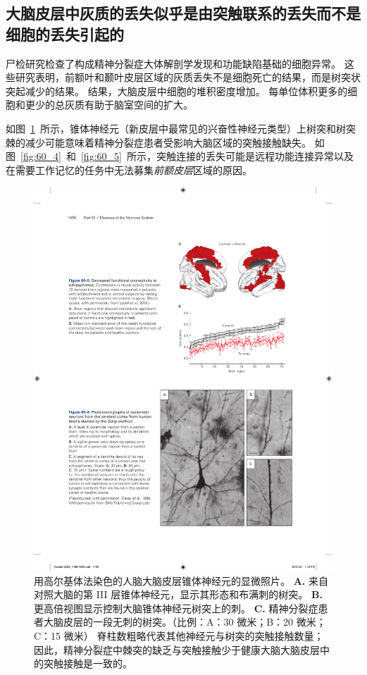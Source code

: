 \subsection{大脑皮层中灰质的丢失似乎是由突触联系的丢失而不是细胞的丢失引起的}

尸检研究检查了构成精神分裂症大体解剖学发现和功能缺陷基础的细胞异常。
这些研究表明，前额叶和颞叶皮层区域的灰质丢失不是细胞死亡的结果，而是树突状突起减少的结果。
结果，大脑皮层中细胞的堆积密度增加。
每单位体积更多的细胞和更少的总灰质有助于脑室空间的扩大。


如图~\ref{fig:60_6}~所示，锥体神经元（新皮层中最常见的兴奋性神经元类型）上树突和树突棘的减少可能意味着精神分裂症患者受影响大脑区域的突触接触缺失。
如图~\ref{fig:60_4}~和~\ref{fig:60_5}~所示，突触连接的丢失可能是远程功能连接异常以及在需要工作记忆的任务中无法募集\textit{前额皮层}区域的原因。


\begin{figure}[htbp]
	\centering
	\includegraphics[width=0.7\linewidth]{chap60/fig_60_6}
	\caption{用高尔基体法染色的人脑大脑皮层锥体神经元的显微照片。
		\textbf{A.} 来自对照大脑的第 III 层锥体神经元，显示其形态和布满刺的树突。
		\textbf{B.} 更高倍视图显示控制大脑锥体神经元树突上的刺。
		\textbf{C.} 精神分裂症患者大脑皮层的一段无刺的树突。（比例：A：30 微米；B：20 微米；C：15 微米）
		脊柱数粗略代表其他神经元与树突的突触接触数量；
		因此，精神分裂症中棘突的缺乏与突触接触少于健康大脑大脑皮层中的突触接触是一致的\cite{garey1998reduced}。}
	\label{fig:60_6}
\end{figure}



